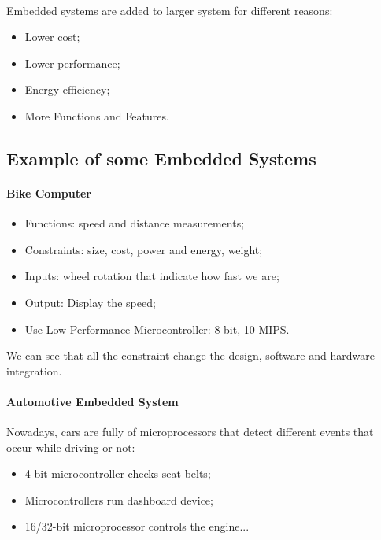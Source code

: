 \paragraph{}
Embedded systems are added to larger system for different reasons:

\begin{itemize}
    \item Lower cost;
    \item Lower performance;
    \item Energy efficiency;
    \item More Functions and Features.
\end{itemize}

\newpage
\subsection{Example of some Embedded Systems}

\paragraph{Bike Computer}

\begin{itemize}
    \item Functions: speed and distance measurements;
    \item Constraints: size, cost, power and energy, weight;
    \item Inputs: wheel rotation that indicate how fast we are;
    \item Output: Display the speed;
    \item Use Low-Performance Microcontroller: 8-bit, 10 MIPS.
\end{itemize}

We can see that all the constraint change the design, software and hardware integration.

\paragraph{Automotive Embedded System}

Nowadays, cars are fully of microprocessors that detect different events that occur while driving or not:

\begin{itemize}
    \item 4-bit microcontroller checks seat belts;
    \item Microcontrollers run dashboard device;
    \item 16/32-bit microprocessor controls the engine...
\end{itemize}


